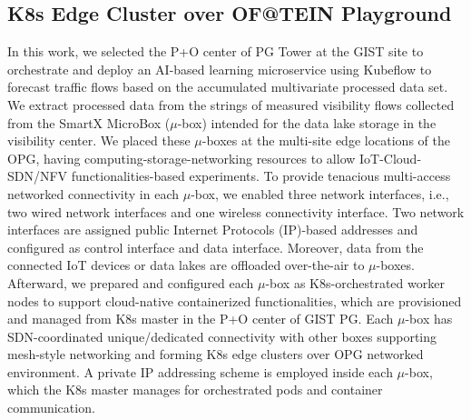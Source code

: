 \documentclass[10pt, conference]{IEEEtran}
\begin{document}
\subsection{K8s Edge Cluster over OF@TEIN Playground}
\label{sec:k8sedgecluster}
In this work, we selected the P+O center of PG Tower at the GIST site to orchestrate and deploy an AI-based learning microservice using Kubeflow to forecast traffic flows based on the accumulated multivariate processed data set. We extract processed data from the strings of measured visibility flows collected from the SmartX MicroBox ($\mu$-box) intended for the data lake storage in the visibility center. We placed these $\mu$-boxes at the multi-site edge locations of the OPG, having computing-storage-networking resources to allow IoT-Cloud-SDN/NFV functionalities-based experiments.
To provide tenacious multi-access networked connectivity in each $\mu$-box, we enabled three network interfaces, i.e., two wired network interfaces and one wireless connectivity interface. Two network interfaces are assigned public Internet Protocols (IP)-based addresses and configured as control interface and data interface. Moreover, data from the connected IoT devices or data lakes are offloaded over-the-air to $\mu$-boxes.  
Afterward, we prepared and configured each $\mu$-box as K8s-orchestrated worker nodes to support cloud-native containerized functionalities, which are provisioned and managed from K8s master in the P+O center of GIST PG. Each $\mu$-box has SDN-coordinated unique/dedicated connectivity with other boxes supporting mesh-style networking and forming K8s edge clusters over OPG networked environment. A private IP addressing scheme is employed inside each $\mu$-box, which the K8s master manages for orchestrated pods and container communication.
\end{document}
